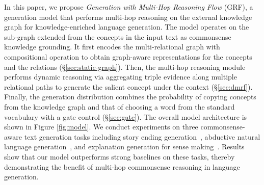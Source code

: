 \documentclass[11pt,a4paper]{article}
\begin{document}
In this paper, we propose \textit{Generation with Multi-Hop Reasoning Flow} (GRF), a generation model that performs multi-hop reasoning on the external knowledge graph for knowledge-enriched language generation.
The model operates on the sub-graph extended from the concepts in the input text as commonsense knowledge grounding. It first encodes the multi-relational graph with compositional operation to obtain graph-aware representations for the concepts and the relations (\S{\ref{sec:static-graph}}). 
Then, the multi-hop reasoning module performs dynamic reasoning via aggregating triple evidence along multiple relational paths %
to generate the salient concept under the context (\S{\ref{sec:dmrf}}). 
Finally, the generation distribution combines the probability of copying concepts from the knowledge graph and that of choosing a word from the standard vocabulary with a gate control (\S{\ref{sec:gate}}). The overall model architecture is shown in Figure \ref{fig:model}. 
We conduct experiments on three commonsense-aware text generation tasks
including story ending generation~\citep{Mostafazadeh2016ACA}, abductive natural language generation~\citep{Bhagavatula2019AbductiveCR}, and explanation generation for sense making~\citep{Wang2019DoesIM}. 
Results show that our model outperforms strong baselines on these tasks, thereby demonstrating the benefit of multi-hop commonsense reasoning in language generation.


\end{document}

